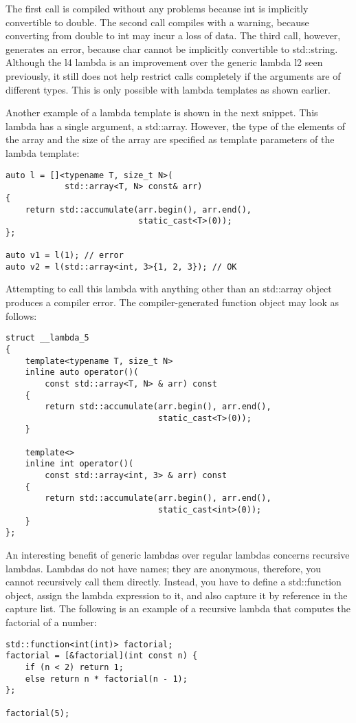 The first call is compiled without any problems because int is implicitly convertible to double. The second call compiles with a warning, because converting from double to int may incur a loss of data. The third call, however, generates an error, because char cannot be implicitly convertible to std::string. Although the l4 lambda is an improvement over the generic lambda l2 seen previously, it still does not help restrict calls completely if the arguments are of different types. This is only possible with lambda templates as shown earlier.

Another example of a lambda template is shown in the next snippet. This lambda has a single argument, a std::array. However, the type of the elements of the array and the size of the array are specified as template parameters of the lambda template:

\begin{lstlisting}[style=styleCXX]
auto l = []<typename T, size_t N>(
            std::array<T, N> const& arr)
{
	return std::accumulate(arr.begin(), arr.end(),
	                       static_cast<T>(0));
};

auto v1 = l(1); // error
auto v2 = l(std::array<int, 3>{1, 2, 3}); // OK
\end{lstlisting}

Attempting to call this lambda with anything other than an std::array object produces a compiler error. The compiler-generated function object may look as follows:

\begin{lstlisting}[style=styleCXX]
struct __lambda_5
{
	template<typename T, size_t N>
	inline auto operator()(
		const std::array<T, N> & arr) const
	{
		return std::accumulate(arr.begin(), arr.end(),
							   static_cast<T>(0));
	}

	template<>
	inline int operator()(
		const std::array<int, 3> & arr) const
	{
		return std::accumulate(arr.begin(), arr.end(),
							   static_cast<int>(0));
	}
};
\end{lstlisting}

An interesting benefit of generic lambdas over regular lambdas concerns recursive lambdas. Lambdas do not have names; they are anonymous, therefore, you cannot recursively call them directly. Instead, you have to define a std::function object, assign the lambda expression to it, and also capture it by reference in the capture list. The following is an example of a recursive lambda that computes the factorial of a number:

\begin{lstlisting}[style=styleCXX]
std::function<int(int)> factorial;
factorial = [&factorial](int const n) {
	if (n < 2) return 1;
	else return n * factorial(n - 1);
};

factorial(5);
\end{lstlisting}


